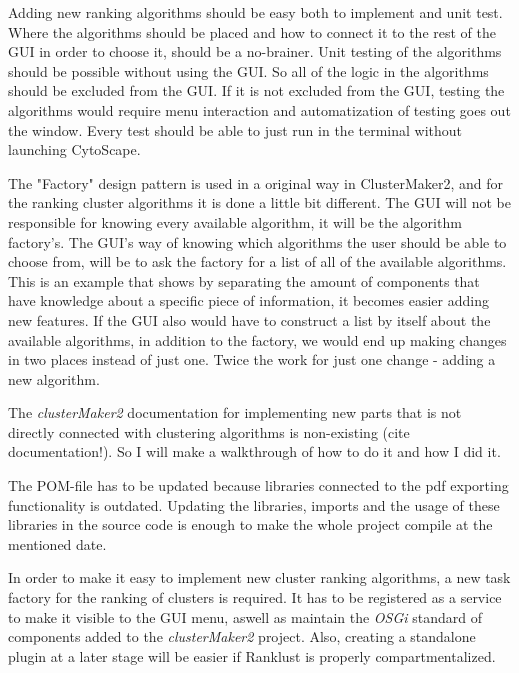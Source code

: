 \documentclass[UKenglish]{ifimaster}
\begin{document}
Adding new ranking algorithms should be easy both to implement and unit test.
Where the algorithms should be placed and how to connect it to the rest of the
GUI in order to choose it, should be a no-brainer. Unit testing of the
algorithms should be possible without using the GUI. So all of the logic in the
algorithms should be excluded from the GUI. If it is not excluded from the GUI,
testing the algorithms would require menu interaction and automatization of
testing goes out the window. Every test should be able to just run in the
terminal without launching CytoScape.

The "Factory" design pattern %
is used in a original way in ClusterMaker2, and for the ranking cluster
algorithms it is done a little bit different.  The GUI will not be responsible
for knowing every available algorithm, it will be the algorithm factory's. The
GUI's way of knowing which algorithms the user should be able to choose from,
will be to ask the factory for a list of all of the available algorithms. This
is an example that shows by separating the amount of components that have
knowledge about a specific piece of information, it becomes easier adding new
features. If the GUI also would have to construct a list by itself about the
available algorithms, in addition to the factory, we would end up making changes
in two places instead of just one. Twice the work for just one change - adding a
new algorithm.


The \textit{clusterMaker2} documentation for implementing new parts that is not
directly connected with clustering algorithms is non-existing (cite
documentation!). So I will make a walkthrough of how to do it and how I did it.

The POM-file has to be updated because libraries connected to the pdf exporting
functionality is outdated. Updating the libraries, imports and the usage of
these libraries in the source code is enough to make the whole project compile
at the mentioned date.

In order to make it easy to implement new cluster ranking algorithms, a new task
factory for the ranking of clusters is required. It has to be registered as a
service to make it visible to the GUI menu, aswell as maintain the \textit{OSGi}
standard of components added to the \textit{clusterMaker2} project. Also,
creating a standalone plugin at a later stage will be easier if Ranklust is
properly compartmentalized.
\end{document}
